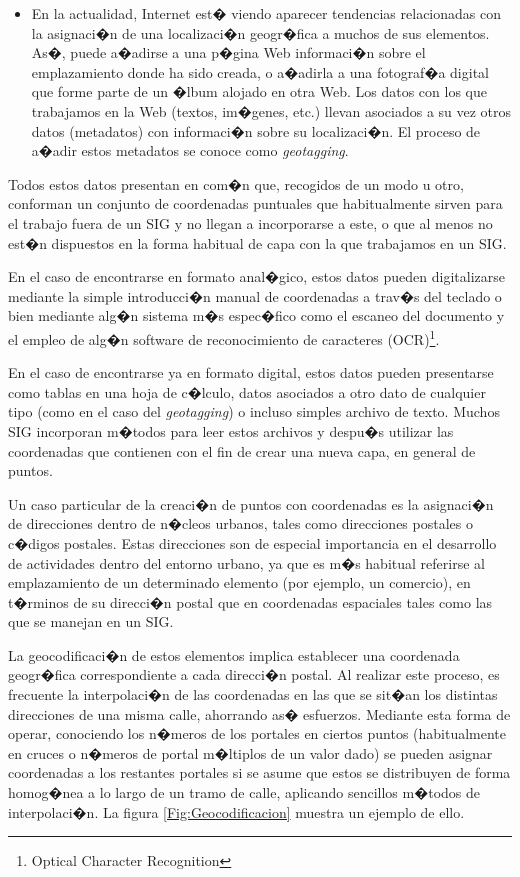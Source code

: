 \begin{itemize}
	\item En la actualidad, Internet est� viendo aparecer tendencias relacionadas con la asignaci�n de una localizaci�n geogr�fica a muchos de sus elementos. As�, puede a�adirse a una p�gina Web informaci�n sobre el emplazamiento donde ha sido creada, o a�adirla a una fotograf�a digital que forme parte de un �lbum alojado en otra Web. Los datos con los que trabajamos en la Web (textos, im�genes, etc.) llevan asociados a su vez otros datos (metadatos) con informaci�n sobre su localizaci�n. El proceso de a�adir estos metadatos se conoce como \emph{geotagging}.
\end{itemize}

Todos estos datos presentan en com�n que, recogidos de un modo u otro, conforman un conjunto de coordenadas puntuales que habitualmente sirven para el trabajo fuera de un SIG y no llegan a incorporarse a este, o que al menos no est�n dispuestos en la forma habitual de capa con la que trabajamos en un SIG. 

En el caso de encontrarse en formato anal�gico, estos datos pueden digitalizarse mediante la simple introducci�n manual de coordenadas a trav�s del teclado o bien mediante alg�n sistema m�s espec�fico como el escaneo del documento y el empleo de alg�n software de reconocimiento de caracteres (OCR)\footnote{Optical Character Recognition}.

En el caso de encontrarse ya en formato digital, estos datos pueden presentarse como tablas en una hoja de c�lculo, datos asociados a otro dato de cualquier tipo (como en el caso del \emph{geotagging}) o incluso simples archivo de texto. Muchos SIG incorporan m�todos para leer estos archivos y despu�s utilizar las coordenadas que contienen con el fin de crear una nueva capa, en general de puntos.

Un caso particular de la creaci�n de puntos con coordenadas es la asignaci�n de direcciones dentro de n�cleos urbanos, tales como direcciones postales o c�digos postales. Estas direcciones son de especial importancia en el desarrollo de actividades dentro del entorno urbano, ya que es m�s habitual referirse al emplazamiento de un determinado elemento (por ejemplo, un comercio), en t�rminos de su direcci�n postal que en coordenadas espaciales tales como las que se manejan en un SIG.

La geocodificaci�n de estos elementos implica establecer una coordenada geogr�fica correspondiente a cada direcci�n postal. Al realizar este proceso, es frecuente la interpolaci�n de las coordenadas en las que se sit�an los distintas direcciones de una misma calle, ahorrando as� esfuerzos. Mediante esta forma de operar, conociendo los n�meros de los portales en ciertos puntos (habitualmente en cruces o n�meros de portal m�ltiplos de un valor dado) se pueden asignar coordenadas a los restantes portales si se asume que estos se distribuyen de forma homog�nea a lo largo de un tramo de calle, aplicando sencillos m�todos de interpolaci�n. La figura \ref{Fig:Geocodificacion} muestra un ejemplo de ello.

